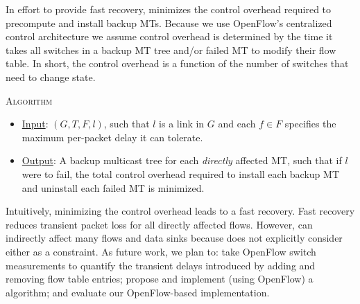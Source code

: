 
In effort to provide fast recovery, \mc minimizes the control overhead required to precompute and install backup MTs.
Because we use OpenFlow's centralized control architecture  we assume control overhead is determined by the time it takes all switches in a backup MT tree and/or failed MT to modify their flow table.  
In short, the control overhead is a function of the number of switches that need to change state.  

\mc \textsc{Algorithm}
\vspace{-0.3cm}
\begin{itemize}

	\item  \underline{Input}: $(G,T,F,l)$, such that $l$ is a link in $G$ and each $f \in F$ specifies the maximum per-packet delay it can tolerate.

	\item \underline{Output}:  A backup multicast tree for each \emph{directly} affected MT, such that if $l$ were to fail, the total control overhead required to install each backup MT and uninstall each failed MT is minimized.

\end{itemize}

Intuitively, minimizing the control overhead leads to a fast recovery.  Fast recovery reduces transient packet loss for all directly affected flows.  
However, \mc can indirectly affect many flows and data sinks because \mc does not explicitly consider either as a constraint. %
As future work, we plan to: take OpenFlow switch measurements to quantify the transient delays introduced by adding and removing flow table entries;  propose and implement (using 
OpenFlow) a \mc algorithm; and evaluate our OpenFlow-based implementation.





